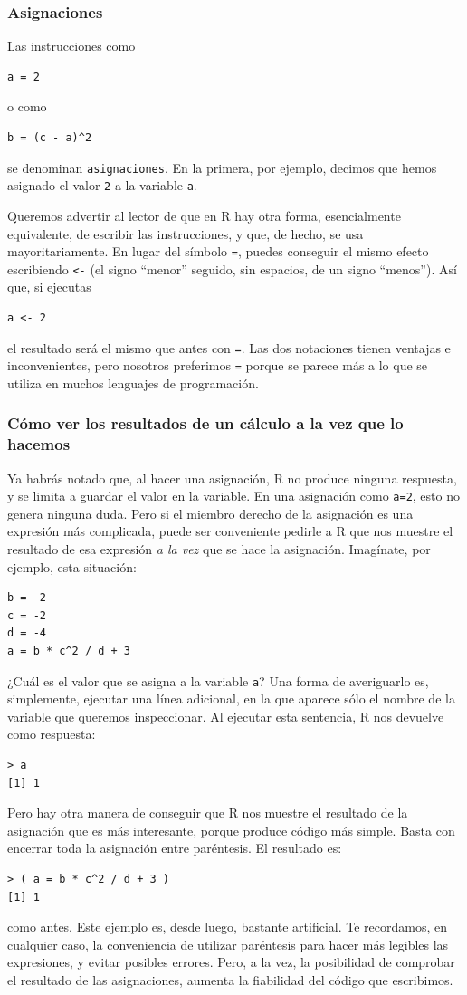 \documentclass[10pt,a4paper]{article}\usepackage[]{graphicx}\usepackage[]{color}
\begin{document}
\subsubsection*{Asignaciones}

Las instrucciones como
\begin{verbatim}
a = 2
\end{verbatim}
o como
\begin{verbatim}
b = (c - a)^2
\end{verbatim}
se denominan {\tt asignaciones}. En la primera, por ejemplo, decimos que hemos asignado el valor {\tt 2} a la variable {\tt a}.

Queremos advertir al lector de que en R hay otra forma, esencialmente equivalente, de escribir las instrucciones, y que, de hecho, se usa mayoritariamente. En lugar del símbolo {\tt =}, puedes conseguir el mismo efecto escribiendo {\tt <-} (el signo ``menor'' seguido, sin espacios, de un signo ``menos''). Así que, si ejecutas
\begin{verbatim}
a <- 2
\end{verbatim}
el resultado será el mismo que antes con {\tt =}. Las dos notaciones tienen ventajas e inconvenientes, pero nosotros preferimos {\tt =} porque se parece más a lo que se utiliza en muchos lenguajes de programación.
\subsubsection*{Cómo ver los resultados de un cálculo a la vez que lo hacemos}

Ya habrás notado que, al hacer una asignación, R no produce ninguna respuesta, y se limita a guardar el valor en la variable. En una asignación como {\tt a=2}, esto no genera ninguna duda. Pero si el miembro derecho de la asignación es una expresión más complicada, puede ser conveniente pedirle a R que nos muestre  el resultado de esa expresión {\em a la vez } que se hace la asignación. Imagínate, por ejemplo, esta situación:
\begin{verbatim}
b =  2
c = -2
d = -4
a = b * c^2 / d + 3
\end{verbatim}
¿Cuál es el valor que se asigna a la variable {\tt a}? Una forma de averiguarlo es, simplemente, ejecutar una línea adicional, en la que aparece sólo el nombre de la variable que queremos inspeccionar. Al ejecutar esta sentencia, R nos devuelve como respuesta:
\begin{verbatim}
> a
[1] 1
\end{verbatim}
Pero hay otra manera de conseguir que R nos muestre el resultado de la asignación que es más interesante, porque produce código más simple. Basta con encerrar toda la asignación entre paréntesis. El resultado es:
\begin{verbatim}
> ( a = b * c^2 / d + 3 )
[1] 1
\end{verbatim}
como antes. Este ejemplo es, desde luego, bastante artificial.  Te recordamos, en cualquier caso, la conveniencia de utilizar paréntesis para hacer más legibles las expresiones, y evitar posibles errores. Pero, a la vez, la posibilidad de comprobar el resultado de las asignaciones, aumenta la fiabilidad del código que escribimos.
\end{document}
